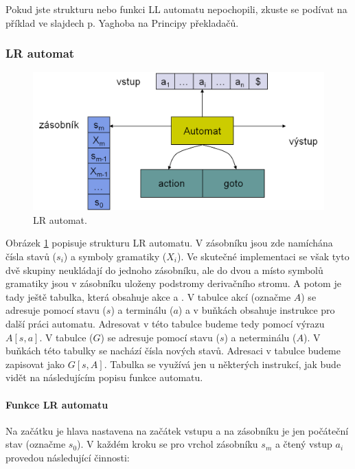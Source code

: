 Pokud jste strukturu nebo funkci LL automatu nepochopili, zkuste se podívat na příklad ve slajdech p. Yaghoba na Principy překladačů.


\subsubsection{LR automat}

\begin{figure}[h]
	\centering
	\includegraphics[width=13cm]{i2/softwarove_inzenyrstvi/obrazky/LR_automat.png}
	\caption{LR automat.}
	\label{pic:LR_automat}
\end{figure}

Obrázek \ref{pic:LR_automat} popisuje strukturu LR automatu. V zásobníku jsou zde namíchána čísla stavů (\(s_i\)) a symboly gramatiky (\(X_i\)). Ve skutečné implementaci se však tyto dvě skupiny neukládají do jednoho zásobníku, ale do dvou a místo symbolů gramatiky jsou v zásobníku uloženy podstromy derivačního stromu. A potom je tady ještě tabulka, která obsahuje akce a . V tabulce akcí (označme \(A\)) se adresuje pomocí stavu (\(s\)) a terminálu (\(a\)) a v buňkách obsahuje instrukce pro další práci automatu. Adresovat v této tabulce budeme tedy pomocí výrazu \(A[s, a]\). V tabulce  (\(G\)) se adresuje pomocí stavu (\(s\)) a neterminálu (\(A\)). V buňkách této tabulky se nachází čísla nových stavů. Adresaci v tabulce  budeme zapisovat jako \(G[s, A]\). Tabulka  se využívá jen u některých instrukcí, jak bude vidět na následujícím popisu funkce automatu.

\paragraph{Funkce LR automatu} Na začátku je hlava nastavena na začátek vstupu a na zásobníku je jen počáteční stav (označme \(s_0\)). V každém kroku se pro vrchol zásobníku \(s_m\) a čtený vstup \(a_i\) provedou následující činnosti:

